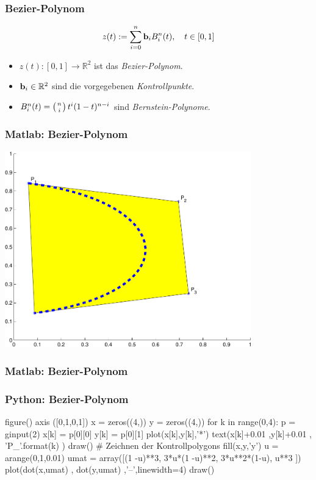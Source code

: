 \documentclass[hyperref={xetex}]{beamer}
\begin{document}
%
%
\begin{frame}[fragile]\frametitle{Bezier-Polynom}
\alert{ \[ z (t):=\sum_{i=0}^n {\bf b}_i B_i^n(t), \quad t \in [0,1] \]}
\begin{itemize}
\item $z(t): [0,1] \rightarrow \mathbb{R}^2$ ist das {\it Bezier-Polynom}.
\item ${\bf b}_i \in \mathbb{R}^2$ sind die vorgegebenen 
{\it Kontrollpunkte}.
\item $B_i^n(t)=\left( n \atop i \right) t^i (1-t)^{n-i}$ sind 
{\it Bernstein-Polynome}.
\end{itemize}
\end{frame}
%
%
\begin{frame}[fragile]\frametitle{Matlab: Bezier-Polynom}
\begin{center}\includegraphics[width=0.8\textwidth]{figures/bezier}\end{center}
\end{frame}
%
%
\begin{frame}[fragile]\frametitle{Matlab: Bezier-Polynom}
\end{frame}
%
%
\begin{frame}[fragile]\frametitle{Python: Bezier-Polynom}
  \begin{pyin}
figure()
axis ([0,1,0,1])
x = zeros((4,))
y = zeros((4,))
for k  in range(0,4):
    p = ginput(2)
    x[k] = p[0][0]
    y[k] = p[0][1]
    plot(x[k],y[k],'*')
    text(x[k]+0.01 ,y[k]+0.01 , 'P_{}'.format(k) )
    draw()
# Zeichnen der Kontrollpolygons
fill(x,y,'y')
u = arange(0,1,0.01)
umat = array([(1 -u)**3, 3*u*(1 -u)**2, 3*u**2*(1-u), u**3 ])
plot(dot(x,umat) , dot(y,umat) ,'--',linewidth=4)
draw()    
  \end{pyin}
\end{frame}
\end{document}
